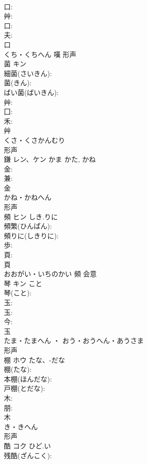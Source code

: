 \documentclass[8pt]{extreport}
\begin{document}
\begin{CJK}{UTF8}{min}
\\	口: 
\\	艸: 
\\	口: 
\\	夫: 
\\	口	
\\	くち・くちへん	嘆	形声 
\\	菌	キン			
\\	細菌(さいきん): 
\\	菌(きん): 
\\	ばい菌(ばいきん): 
\\	艸: 
\\	囗: 
\\	禾: 
\\	艸	
\\	くさ・くさかんむり	
\\	形声 
\\	鎌	レン、ケン	かま	かた, かね	
\\	金: 
\\	兼: 
\\	金	
\\	かね・かねへん	
\\	形声 
\\	頻	ヒン	しき.りに		
\\	頻繁(ひんぱん): 
\\	頻りに(しきりに): 
\\	歩: 
\\	頁: 
\\	頁	
\\	おおがい・いちのかい	頻	会意 
\\	琴	キン	こと		
\\	琴(こと): 
\\	玉: 
\\	玉: 
\\	今: 
\\	玉	
\\	たま・たまへん ・ おう・おうへん・あうさま	
\\	形声 
\\	棚	ホウ	たな、-だな		
\\	棚(たな): 
\\	本棚(ほんだな): 
\\	戸棚(とだな): 
\\	木: 
\\	朋: 
\\	木	
\\	き・きへん	
\\	形声 
\\	酷	コク	ひど.い		
\\	残酷(ざんこく): 

\end{CJK}
\end{document}
